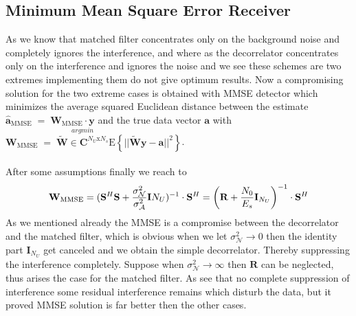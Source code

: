 \subsection{Minimum Mean Square Error Receiver}
As we know that matched filter concentrates only on the background noise and completely ignores the interference, and where as the decorrelator concentrates only on the interference and ignores the noise and we see these schemes are two extremes implementing them do not give optimum results. Now a compromising solution for the two extreme cases is obtained with MMSE detector which minimizes the average squared Euclidean distance between the estimate $\mathrm{\mathbf{\hat{a}}_{MMSE}}\;=\;\mathrm{\mathbf{W}_{MMSE}}\cdot\mathrm{\mathbf{y}}$ and the true data vector $\mathrm{\mathbf{a}}$ with $\mathrm{\mathbf{W}_{MMSE}}\;=\;\stackrel{argmin}{\tilde{\mathrm{\mathbf{W}}}\in\mathrm{\mathbf{C}}^{N_U\mathrm{x}N_s}}\mathrm{E}\left\{\vert\vert\mathrm{\mathbf{\tilde{W}y}}-\mathrm{\mathbf{a}}\vert\vert^2\right\}$.\\ \\
After some assumptions finally we reach to
\begin{equation}
\mathrm{\mathbf{W}_{MMSE}}=(\mathrm{\mathbf{S}}^H\mathrm{\mathbf{S}}+\frac{\hbox{$\sigma^2_{\mathcal{N}}$}}{\hbox{$\sigma^2_{\mathcal{A}}$}}\mathrm{\mathbf{I}}N_U)^{-1}\cdot\mathrm{\mathbf{S}}^{H}=\left(\mathrm{\mathbf{R}}+\frac{\hbox{$N_0$}}{\hbox{$E_s$}}\mathrm{\mathbf{I}}_{N_U}\right)^{-1}\cdot\mathrm{\mathbf{S}}^H
\end{equation}
As we mentioned already the MMSE is a compromise between the decorrelator and the matched filter, which is obvious when we let $\sigma^2_{\mathcal{N}}\rightarrow 0$ then the identity part $\mathrm{\mathbf{I}}_{N_U}$ get canceled and we obtain the simple decorrelator. Thereby suppressing the interference completely. Suppose when  $\sigma^2_{\mathcal{N}}\rightarrow \infty$ then $\mathrm{\mathbf{R}}$ can be neglected, thus arises the case for the matched filter. As see that no complete suppression of interference some residual interference remains which disturb the data, but it proved MMSE solution is far better then the other cases.
